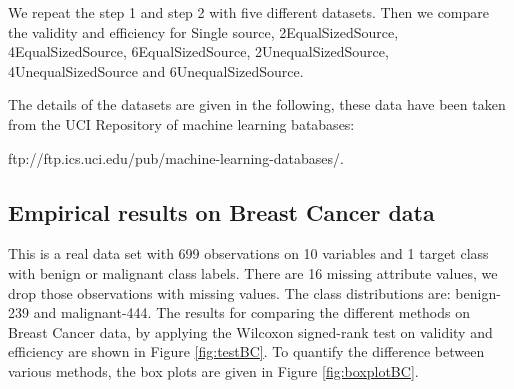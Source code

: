 \documentclass[main]{subfiles}
\begin{document}
We repeat the step 1 and step 2 with five different datasets. Then we compare the validity and efficiency for Single source, 2EqualSizedSource, 4EqualSizedSource, 6EqualSizedSource, 2UnequalSizedSource, 4UnequalSizedSource and 6UnequalSizedSource. 

The details of the datasets are given in the following, these data have been taken from the UCI Repository of machine learning batabases: 

ftp://ftp.ics.uci.edu/pub/machine-learning-databases/.

\subsection{Empirical results on Breast Cancer data}
This is a real data set with 699 observations on 10 variables and 1 target class with benign or malignant class labels. There are 16 missing attribute values, we drop those observations with missing values. The class distributions are: benign-239 and malignant-444.
The results for comparing the different methods on Breast Cancer data, by applying the Wilcoxon signed-rank test on validity and efficiency are shown in Figure \ref{fig:testBC}. To quantify the difference between various methods, the box plots are given in Figure \ref{fig:boxplotBC}.
\end{document}
